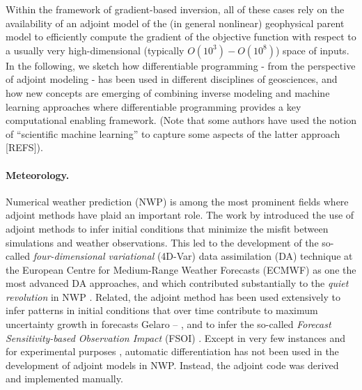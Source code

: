 %
Within the framework of gradient-based inversion, all of these cases rely on the availability of an adjoint model of the (in general nonlinear) geophysical parent model to efficiently compute the gradient of the objective function with respect to a usually very high-dimensional (typically $O(10^3) - O(10^8)$) space of inputs.
In the following, we sketch how differentiable programming - from the perspective of adjoint modeling - has been used in different disciplines of geosciences, and how new concepts are emerging of combining inverse modeling and machine learning approaches where differentiable programming provides a key computational enabling framework. (Note that some authors have used the notion of ``scientific machine learning'' to capture some aspects of the latter approach [REFS]).

\paragraph{Meteorology.}
Numerical weather prediction (NWP) is among the most prominent fields where adjoint methods have plaid an important role. 
The work by \cite{Talagrand.1987,Courtier.1987} introduced the use of adjoint methods to infer initial conditions that minimize the misfit between simulations and weather observations. 
This led to the development of the so-called \textit{four-dimensional variational} (4D-Var) data assimilation (DA) technique \cite{Rabier.1992,Rabier:2000uu} at the European Centre for Medium-Range Weather Forecasts (ECMWF) as one the most advanced DA approaches, and which contributed substantially to the \textit{quiet revolution} in NWP \cite{Bauer.2015}.
Related, the adjoint method has been used extensively to infer patterns in initial conditions that over time contribute to maximum uncertainty growth in forecasts Gelaro -- \cite{REFS}, and to infer the so-called \textit{Forecast Sensitivity-based Observation Impact} (FSOI) \cite{Langland:2004jo}.
Except in very few instances and for experimental purposes \cite{Giering.2006}, automatic differentiation has not been used in the development of adjoint models in NWP.
Instead, the adjoint code was derived and implemented manually.

